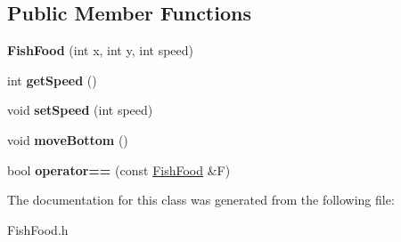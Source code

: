 \subsection*{Public Member Functions}
\begin{DoxyCompactItemize}
\item 
\mbox{\label{class_fish_food_ae5d65712b4a210fb0d0b4b7ff73437a4}} 
{\bfseries Fish\+Food} (int x, int y, int speed)
\item 
\mbox{\label{class_fish_food_a80b014bc6c50a1ff587f370deea1d7e1}} 
int {\bfseries get\+Speed} ()
\item 
\mbox{\label{class_fish_food_a3451d81067fbdd80cb56a86ff8e8d2b4}} 
void {\bfseries set\+Speed} (int speed)
\item 
\mbox{\label{class_fish_food_a82804b517124060d60ddd983d6e986ba}} 
void {\bfseries move\+Bottom} ()
\item 
\mbox{\label{class_fish_food_a1a6fccff6e7b76ab5ab4840f09de2967}} 
bool {\bfseries operator==} (const \mbox{\hyperlink{class_fish_food}{Fish\+Food}} \&F)
\end{DoxyCompactItemize}


The documentation for this class was generated from the following file\+:\begin{DoxyCompactItemize}
\item 
Fish\+Food.\+h\end{DoxyCompactItemize}
